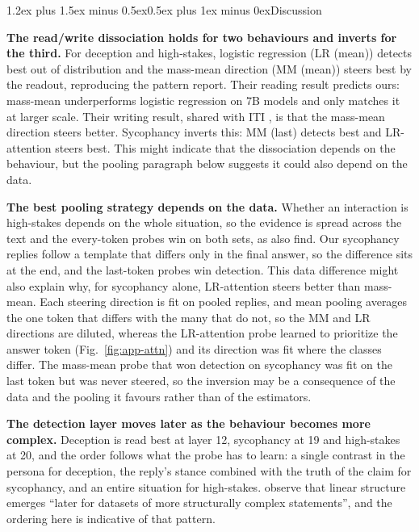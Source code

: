 \documentclass[conference]{IEEEtran}
\makeatletter
\renewcommand{\section}{\@startsection{section}{1}{\z@}%
  {1.2ex plus 1.5ex minus 0.5ex}{0.5ex plus 1ex minus 0ex}{\normalfont\normalsize\centering\scshape}}
\makeatother
\begin{document}
\section{Discussion}

\textbf{The read/write dissociation holds for two behaviours and inverts for
the third.} For deception and high-stakes, logistic regression (LR (mean)) detects best out of
distribution and the mass-mean direction (MM (mean)) steers best by the readout, reproducing the
pattern \citet{marks2024} report. Their reading result
predicts ours: mass-mean underperforms logistic regression on 7B models
and only matches it at larger scale. Their writing result, shared with ITI
\citep{li2023}, is that the mass-mean direction steers better. Sycophancy
inverts this: MM (last) detects best and LR-attention steers best. This
might indicate that the dissociation depends on the behaviour, but the
pooling paragraph below suggests it could also depend on the data.

\textbf{The best pooling strategy depends on the data.}
Whether an interaction is high-stakes depends on the whole situation, so
the evidence is spread across the text and the every-token probes win on
both sets, as \citet{mckenzie2025} also find. Our sycophancy replies
follow a template that differs only in the final answer, so the
difference sits at the end, and the last-token probes win detection. This data
difference might also explain why, for sycophancy alone, LR-attention
steers better than mass-mean. Each steering direction is fit on pooled
replies, and mean pooling averages the one token that differs with the
many that do not, so the MM and LR directions are
diluted, whereas the LR-attention probe learned to prioritize the answer token
(Fig.~\ref{fig:app-attn}) and its direction was fit where the classes
differ. The mass-mean probe that won detection on sycophancy was fit on the last token
but was never steered, so the inversion may be a consequence of the data
and the pooling it favours rather than of the estimators.

\textbf{The detection layer moves later as the behaviour becomes more
complex.} Deception is read best at layer 12, sycophancy at 19 and
high-stakes at 20, and the order follows what the probe has to learn: a
single contrast in the persona for deception, the reply's stance combined
with the truth of the claim for sycophancy, and an entire situation for
high-stakes. \citet[§4]{marks2024} observe that linear structure emerges
``later for datasets of more structurally complex statements'', and the
ordering here is indicative of that pattern.
\end{document}
